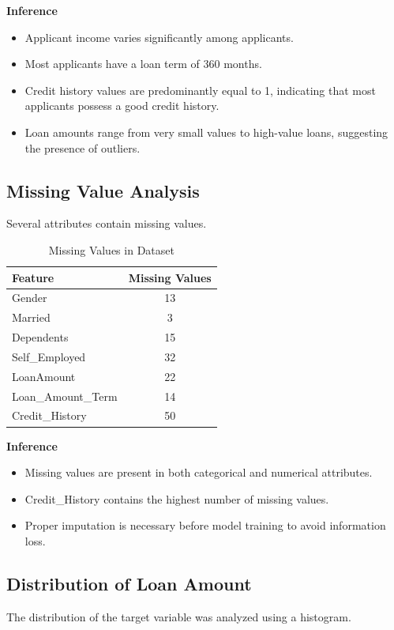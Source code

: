\documentclass{article}
\begin{document}
\noindent \textbf{Inference} 
\begin{itemize} 
    \item Applicant income varies significantly among applicants. 
    \item Most applicants have a loan term of 360 months. 
    \item Credit history values are predominantly equal to 1, indicating that most applicants possess a good credit history. 
    \item Loan amounts range from very small values to high-value loans, suggesting the presence of outliers. 
\end{itemize} 

\subsection{Missing Value Analysis} 
Several attributes contain missing values. 

\begin{table}[H] 
\centering 
\caption{Missing Values in Dataset} 
\begin{tabular}{|l|c|} 
\hline 
\textbf{Feature} & \textbf{Missing Values}\\ \hline 
Gender & 13\\ 
Married & 3\\ 
Dependents & 15\\ 
Self\_Employed & 32\\ 
LoanAmount & 22\\ 
Loan\_Amount\_Term & 14\\ 
Credit\_History & 50\\ \hline 
\end{tabular} 
\end{table} 

\noindent \textbf{Inference} 
\begin{itemize} 
    \item Missing values are present in both categorical and numerical attributes. 
    \item Credit\_History contains the highest number of missing values. 
    \item Proper imputation is necessary before model training to avoid information loss. 
\end{itemize} 

\subsection{Distribution of Loan Amount} 
The distribution of the target variable was analyzed using a histogram. 
\end{document}
